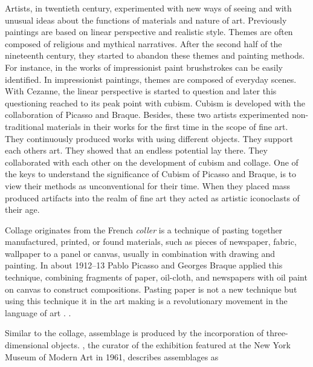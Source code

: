 Artists, in twentieth century, experimented with new ways of seeing and with unusual ideas about the functions of materials and nature of art. Previously paintings are based on linear perspective and realistic style. Themes are often composed of religious and mythical narratives. After the second half of the nineteenth century, they started to abandon these themes and painting methods. For instance, in the works of impressionist paint brushstrokes can be easily identified. In impressionist paintings, themes are composed of everyday scenes. With Cezanne, the linear perspective is started to question and later this questioning reached to its peak point with cubism. Cubism is developed with the collaboration of Picasso and Braque. Besides, these two artists experimented non-traditional materials in their works for the first time in the scope of fine art. They continuously produced works with using different objects. They support each others art. They showed that an endless potential lay there. They collaborated with each other on the development of cubism and collage. One of the keys to understand the significance of Cubism of Picasso and Braque, is to view their methods as unconventional for their time. When they placed mass produced artifacts into the realm of fine art they acted as artistic iconoclasts of their age.

Collage originates from the French \textit{coller} is a technique of pasting together manufactured, printed, or found materials, such as pieces of newspaper, fabric, wallpaper to a panel or canvas, usually in combination with drawing and painting. In about 1912–13 Pablo Picasso and Georges Braque applied this technique, combining fragments of paper, oil-cloth, and newspapers with oil paint on canvas to construct compositions. Pasting paper is not a new technique but using this technique it in the art making is a revolutionary movement in the language of art \citep{waldman1992collage}.  \citep{greenberg1984collage}.

Similar to the collage, assemblage is produced by the incorporation of three-dimensional objects. \cite{seitz1961art}, the curator of the exhibition  featured at the New York Museum of Modern Art in 1961, describes assemblages as 


